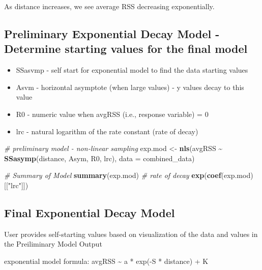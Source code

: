 \documentclass[
]{book}
\newenvironment{Shaded}{\begin{snugshade}}{\end{snugshade}}
\newcommand{\AttributeTok}[1]{\textcolor[rgb]{0.13,0.29,0.53}{#1}}
\newcommand{\CommentTok}[1]{\textcolor[rgb]{0.56,0.35,0.01}{\textit{#1}}}
\newcommand{\FunctionTok}[1]{\textcolor[rgb]{0.13,0.29,0.53}{\textbf{#1}}}
\newcommand{\NormalTok}[1]{#1}
\newcommand{\OtherTok}[1]{\textcolor[rgb]{0.56,0.35,0.01}{#1}}
\newcommand{\SpecialCharTok}[1]{\textcolor[rgb]{0.81,0.36,0.00}{\textbf{#1}}}
\newcommand{\StringTok}[1]{\textcolor[rgb]{0.31,0.60,0.02}{#1}}
\providecommand{\tightlist}{%
  \setlength{\itemsep}{0pt}\setlength{\parskip}{0pt}}
\begin{document}
As distance increases, we see average RSS decreasing exponentially.

\subsection{Preliminary Exponential Decay Model - Determine starting values for the final model}\label{preliminary-exponential-decay-model---determine-starting-values-for-the-final-model}

\begin{itemize}
\tightlist
\item
  SSasvmp - self start for exponential model to find the data starting values
\item
  Asvm - horizontal asymptote (when large values) - y values decay to this value
\item
  R0 - numeric value when avgRSS (i.e., response variable) = 0
\item
  lrc - natural logarithm of the rate constant (rate of decay)
\end{itemize}

\begin{Shaded}
\begin{Highlighting}[]
\CommentTok{\# preliminary model {-} non{-}linear sampling}
\NormalTok{exp.mod }\OtherTok{\textless{}{-}} \FunctionTok{nls}\NormalTok{(avgRSS }\SpecialCharTok{\textasciitilde{}} \FunctionTok{SSasymp}\NormalTok{(distance, }
\NormalTok{                                Asym, }
\NormalTok{                                R0, }
\NormalTok{                                lrc), }
               \AttributeTok{data =}\NormalTok{ combined\_data)}

  \CommentTok{\# Summary of Model}
\FunctionTok{summary}\NormalTok{(exp.mod)}
  \CommentTok{\# rate of decay}
\FunctionTok{exp}\NormalTok{(}\FunctionTok{coef}\NormalTok{(exp.mod)[[}\StringTok{"lrc"}\NormalTok{]])}
\end{Highlighting}
\end{Shaded}

\subsection{Final Exponential Decay Model}\label{final-exponential-decay-model}

User provides self-starting values based on visualization of the data and values in the Preiliminary Model Output

exponential model formula: avgRSS \textasciitilde{} a * exp(-S * distance) + K
\end{document}
